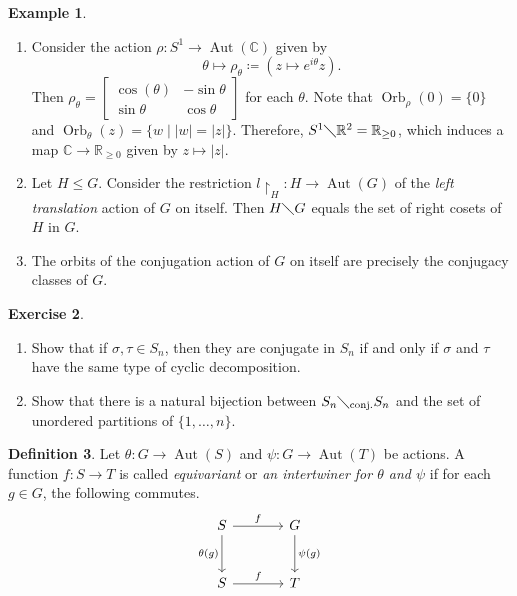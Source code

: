 \documentclass[10pt,letterpaper,cm]{nupset}
\theoremstyle{definition}
\newtheorem{definition}{Definition}[subsection]
\newtheorem{exmp}[definition]{Example}
\theoremstyle{theorem}
\newtheorem{exercise}[definition]{Exercise}
\theoremstyle{remark}
\newcommand{\C}{\mathbb C}
\newcommand{\R}{\mathbb R}
\newcommand{\1}{\mathbf{1}}
\newcommand{\0}{\vec 0}
\DeclareMathOperator{\aut}{Aut}
\DeclareMathOperator{\orb}{Orb}
\begin{document}
\begin{exmp} $ $
\begin{enumerate}
\item Consider the action $\rho: S^1 \to \aut(\C)$ given by $$\theta \mapsto \rho_{\theta}\coloneqq (z \mapsto e^{i\theta}z).$$ Then $\rho_{\theta} = \begin{bmatrix} \cos(\theta) & {-}\sin{\theta} \\ \sin{\theta} & \cos{\theta} \end{bmatrix}$ for each $\theta$.  Note that $\orb_{\rho}(0) = \{0\}$ and $\orb_{\theta}(z) = \{w \mid |w| = |z|\}$. Therefore,  $S^1 \diagdown \R^2 = \R_{\geq 0}$, which induces a map $\C \to \R_{\geq 0}$ given by $z \mapsto |z|$.
\item Let $H \leq G$. Consider the restriction $l\restriction_H : H \to \aut(G)$ of the \textit{left translation} action of $G$ on itself. Then $H \diagdown G$ equals the set of right cosets of $H$ in $G$. 
\item The orbits of the conjugation action of $G$ on itself are precisely  the conjugacy classes of $G$. 
\end{enumerate}
\end{exmp}

\begin{exercise} $ $
\begin{enumerate}

\item Show that if $\sigma, \tau \in S_n$, then they are conjugate in $S_n$  if and only if $\sigma$ and $\tau$ have the same type of cyclic decomposition.
\item Show that there is a natural bijection between $S_n \diagdown_{\text{conj.}} S_n$ and the set of unordered partitions of $\{1, \ldots, n\}$.
\end{enumerate}
\end{exercise}

\begin{definition}
Let $\theta : G \to \aut(S)$ and $\psi: G \to \aut(T)$ be actions. A function $f: S \to T$ is called \textit{equivariant} or \textit{an intertwiner for $\theta$ and $\psi$} if for each $g \in G$, the following commutes.
\[
\begin{tikzcd}[row sep=large, column sep = large]
S \arrow[r, "f"] \arrow[d, "\theta(g)", swap]
& G \arrow[d, "\psi(g)"] \\
S \arrow[r, "f"]
& T
\end{tikzcd}
\]
\end{definition}
\end{document}

